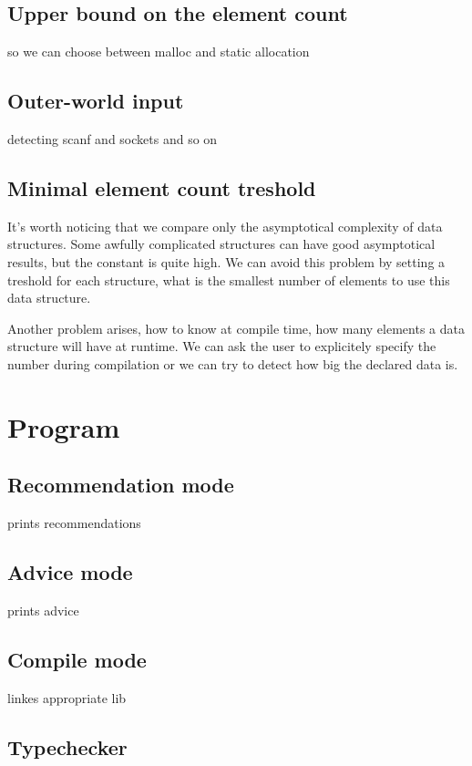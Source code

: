 \documentclass[11pt]{article}
\begin{document}
	\subsection{Upper bound on the element count}
		so we can choose between malloc and static allocation
	\subsection{Outer-world input}
		detecting scanf and sockets and so on
	\subsection{Minimal element count treshold}
		It's worth noticing that we compare only the asymptotical complexity of data structures. Some awfully complicated structures can have good asymptotical results, but the constant is quite high. We can avoid this problem by setting a treshold for each structure, what is the smallest number of elements to use this data structure.

		Another problem arises, how to know at compile time, how many elements a data structure will have at runtime. We can ask the user to explicitely specify the number during compilation or we can try to detect how big the declared data is.
\section{Program}
	\subsection{Recommendation mode}
		prints recommendations
	\subsection{Advice mode}
		prints advice
	\subsection{Compile mode}
		linkes appropriate lib
	\subsection{Typechecker}
\end{document}

